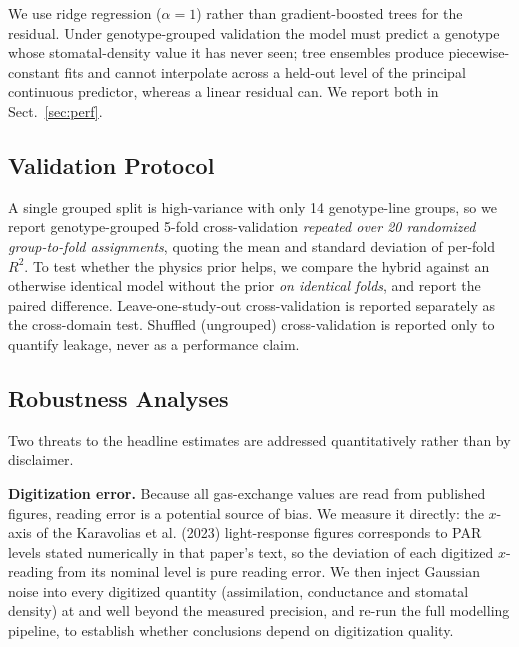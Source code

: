 \documentclass[runningheads]{llncs}
\begin{document}
We use ridge regression ($\alpha=1$) rather than gradient-boosted trees for the residual. Under genotype-grouped validation the model must predict a genotype whose stomatal-density value it has never seen; tree ensembles produce piecewise-constant fits and cannot interpolate across a held-out level of the principal continuous predictor, whereas a linear residual can. We report both in Sect.~\ref{sec:perf}.

\subsection{Validation Protocol}\label{sec:validation}

A single grouped split is high-variance with only 14 genotype-line groups, so we report genotype-grouped 5-fold cross-validation \emph{repeated over 20 randomized group-to-fold assignments}, quoting the mean and standard deviation of per-fold $R^{2}$. To test whether the physics prior helps, we compare the hybrid against an otherwise identical model without the prior \emph{on identical folds}, and report the paired difference. Leave-one-study-out cross-validation is reported separately as the cross-domain test. Shuffled (ungrouped) cross-validation is reported only to quantify leakage, never as a performance claim.

\subsection{Robustness Analyses}\label{sec:robustness}

Two threats to the headline estimates are addressed quantitatively rather than by disclaimer.

\textbf{Digitization error.} Because all gas-exchange values are read from published figures, reading error is a potential source of bias. We measure it directly: the $x$-axis of the Karavolias et al. (2023) light-response figures corresponds to PAR levels stated numerically in that paper's text, so the deviation of each digitized $x$-reading from its nominal level is pure reading error. We then inject Gaussian noise into every digitized quantity (assimilation, conductance and stomatal density) at and well beyond the measured precision, and re-run the full modelling pipeline, to establish whether conclusions depend on digitization quality.
\end{document}

